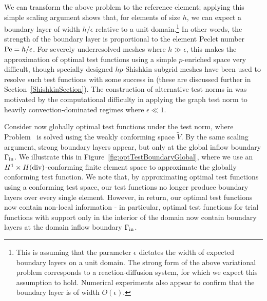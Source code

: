 We can transform the above problem to the reference element; applying this simple scaling argument shows that, for elements of size $h$, we can expect a boundary layer of width $h/\epsilon$ relative to a unit domain.\footnote{This is assuming that the parameter $\epsilon$ dictates the width of expected boundary layers on a unit domain. The strong form of the above variational problem corresponds to a reaction-diffusion system, for which we expect this assumption to hold.  Numerical experiments also appear to confirm that the boundary layer is of width $O(\epsilon)$.}  In other words, the strength of the boundary layer is proportional to the element Peclet number ${\rm Pe} = h/\epsilon$.  For severely underresolved meshes where $h \gg \epsilon$, this makes the approximation of optimal test functions using a simple $p$-enriched space very difficult, though specially designed $hp$-Shishkin subgrid meshes have been used to resolve such test functions with some success in \cite{DBLP:journals/procedia/NiemiCC11} (these are discussed further in Section~\ref{ShishkinSection}).  The construction of alternative test norms in \cite{DPGrobustness} was motivated by the computational difficulty in applying the graph test norm to heavily convection-dominated regimes where $\epsilon \ll 1$.  

Consider now globally optimal test functions under the test norm, where Problem~ is solved using the weakly conforming space $\tilde{V}$.  By the same scaling argument, strong boundary layers appear, but only at the global inflow boundary $\Gamma_{\rm in}$.  We illustrate this in Figure~\ref{fig:optTestBoundaryGlobal}, where we use an $H^1\times H({\rm div})$-conforming finite element space to approximate the globally conforming test function.  We note that, by approximating optimal test functions using a conforming test space, our test functions no longer produce boundary layers over every single element. However, in return, our optimal test functions now contain non-local information - in particular, optimal test functions for trial functions with support only in the interior of the domain now contain boundary layers at the domain inflow boundary $\Gamma_{\rm in}$.

